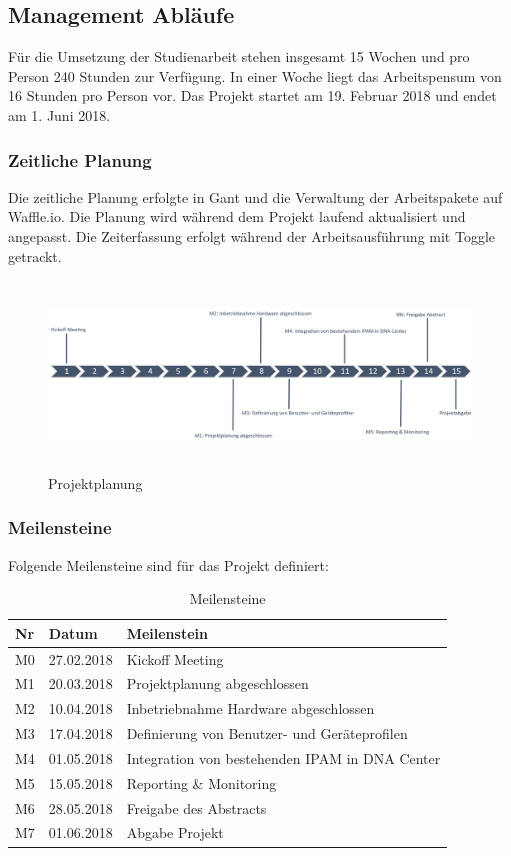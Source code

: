 \subsection{Management Abläufe}
Für die Umsetzung der Studienarbeit stehen insgesamt 15 Wochen und pro Person 240 Stunden zur Verfügung. In einer Woche liegt das Arbeitspensum von 16 Stunden pro Person vor. Das Projekt startet am 19. Februar 2018 und endet am 1. Juni 2018.

\subsubsection{Zeitliche Planung}
Die zeitliche Planung erfolgte in Gant und die Verwaltung der Arbeitspakete auf Waffle.io. Die Planung wird während dem Projekt laufend aktualisiert und angepasst. Die Zeiterfassung erfolgt während der Arbeitsausführung mit Toggle getrackt.

\begin{figure}[H]
	\centering
	\includegraphics[height=5cm]{img/ZeitlichePlanung_v3.png}
	\caption{Projektplanung}
	\label{fig:Projektplanung}
\end{figure} 

\subsubsection{Meilensteine}
Folgende Meilensteine sind für das Projekt definiert:
\begin{table}[H]
	\centering
	\begin{tabularx}{\textwidth}{p{1cm}| p{2.5cm}| X}
		\rowcolor{gray!50}
		\textbf{Nr} & \textbf{Datum} & \textbf{Meilenstein} \\
		\hline	
		M0 & 27.02.2018 & Kickoff Meeting \\
		M1 & 20.03.2018 & Projektplanung abgeschlossen \\
		M2 & 10.04.2018 & Inbetriebnahme Hardware abgeschlossen \\
		M3 & 17.04.2018 & Definierung von Benutzer- und Geräteprofilen \\
		M4 & 01.05.2018 & Integration von bestehenden IPAM in DNA Center \\
		M5 & 15.05.2018 & Reporting \& Monitoring \\
		M6 & 28.05.2018 & Freigabe des Abstracts \\
		M7 & 01.06.2018 & Abgabe Projekt \\
	\end{tabularx}
	\caption{Meilensteine}
	\label{tab:Meilensteine}
\end{table}


